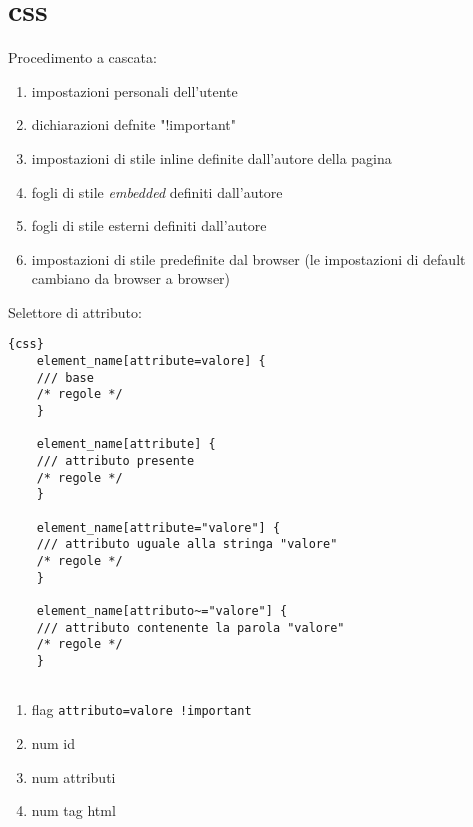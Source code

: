 \documentclass[12pt]{article}
\begin{document}
\copertina
\tableofcontents
\newpage

\section{css}
Procedimento a cascata:
\begin{enumerate}
	\item impostazioni personali dell'utente
	\item dichiarazioni defnite "!important"
	\item impostazioni di stile inline definite dall'autore della pagina
	\item fogli di stile \textit{embedded} definiti dall'autore
	\item fogli di stile esterni definiti dall'autore
	\item impostazioni di stile predefinite dal browser (le impostazioni di
	      default cambiano da browser a browser)
\end{enumerate}

Selettore di attributo:
\begin{lstlisting}{css}
	element_name[attribute=valore] { 
	/// base
	/* regole */
	}

	element_name[attribute] { 
	/// attributo presente
	/* regole */
	}

	element_name[attribute="valore"] { 
	/// attributo uguale alla stringa "valore"
	/* regole */
	}

	element_name[attributo~="valore"] { 
	/// attributo contenente la parola "valore"
	/* regole */
	}
	
\end{lstlisting}

\begin{definition}[ereditarietà]
	\begin{enumerate}
		\item flag \lstinline{attributo=valore !important}
		\item num id
		\item num attributi
		\item num tag html
	\end{enumerate}
\end{definition}
\end{document}
